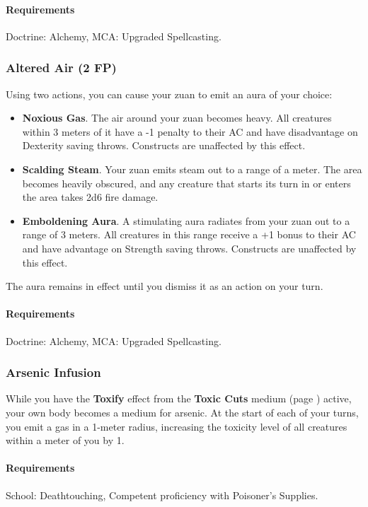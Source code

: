     \paragraph{Requirements} Doctrine: Alchemy, MCA: Upgraded Spellcasting.
\subsubsection{Altered Air (2 FP)} \label{feat::alteredair}
    Using two actions, you can cause your zuan to emit an aura of your choice:
    \begin{itemize}
        \item \textbf{Noxious Gas}.
        The air around your zuan becomes heavy.
        All creatures within 3 meters of it have a -1 penalty to their AC and have disadvantage on Dexterity saving throws.
        Constructs are unaffected by this effect.
        \item \textbf{Scalding Steam}.
        Your zuan emits steam out to a range of a meter.
        The area becomes heavily obscured, and any creature that starts its turn in or enters the area takes 2d6 fire damage.
        \item \textbf{Emboldening Aura}.
        A stimulating aura radiates from your zuan out to a range of 3 meters.
        All creatures in this range receive a +1 bonus to their AC and have advantage on Strength saving throws.
        Constructs are unaffected by this effect.
    \end{itemize}

    The aura remains in effect until you dismiss it as an action on your turn.
    \paragraph{Requirements} Doctrine: Alchemy, MCA: Upgraded Spellcasting.
\subsubsection{Arsenic Infusion} \label{feat::arsenicinfusion}
    While you have the \textbf{Toxify} effect from the \textbf{Toxic Cuts} medium (page \pageref{medium::toxiccuts}) active, your own body becomes a medium for arsenic.
    At the start of each of your turns, you emit a gas in a 1-meter radius, increasing the toxicity level of all creatures within a meter of you by 1.
    \paragraph{Requirements} School: Deathtouching, Competent proficiency with Poisoner's Supplies.
